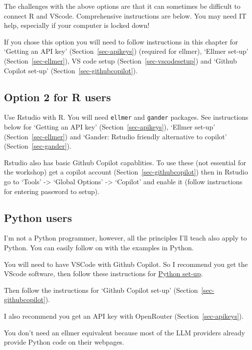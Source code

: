 \documentclass[
  letterpaper,
  DIV=11,
  numbers=noendperiod]{scrreprt}
\begin{document}
The challenges with the above options are that it can sometimes be
difficult to connect R and VScode. Comprehensive instructions are below.
You may need IT help, especially if your computer is locked down!

If you chose this option you will need to follow instructions in this
chapter for `Getting an API key' (Section~\ref{sec-apikeys}) (required
for ellmer), `Ellmer set-up' (Section~\ref{sec-ellmer}), VS code setup
(Section~\ref{sec-vscodesetup}) and `Github Copilot set-up'
(Section~\ref{sec-githubcopilot}).

\subsection{Option 2 for R users}\label{option-2-for-r-users}

Use Rstudio with R. You will need \texttt{ellmer} and \texttt{gander}
packages. See instructions below for `Getting an API key'
(Section~\ref{sec-apikeys}), `Ellmer set-up' (Section~\ref{sec-ellmer})
and `Gander: Rstudio friendly alternative to copilot'
(Section~\ref{sec-gander}).

Rstudio also has basic Github Copilot capablities. To use these (not
essential for the workshop) get a copilot account
(Section~\ref{sec-githubcopilot}) then in Rstudio go to `Tools'
-\textgreater{} `Global Options' -\textgreater{} `Copilot' and enable it
(follow instructions for entering password to setup).

\subsection{Python users}\label{python-users}

I'm not a Python programmer, however, all the principles I'll teach also
apply to Python. You can easily follow on with the examples in Python.

You will need to have VSCode with Github Copilot. So I recommend you get
the VScode software, then follow these instructions for
\href{https://code.visualstudio.com/docs/python/python-tutorial}{Python
set-up}.

Then follow the instructions for `Github Copilot set-up'
(Section~\ref{sec-githubcopilot}).

I also recommend you get an API key with OpenRouter
(Section~\ref{sec-apikeys}).

You don't need an ellmer equivalent because most of the LLM providers
already provide Python code on their webpages.
\end{document}
